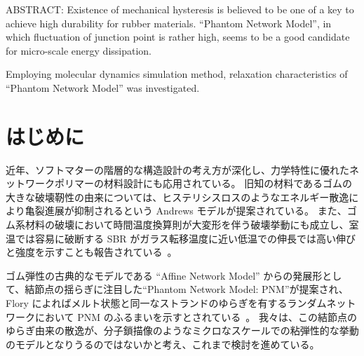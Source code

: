 \documentclass[uplatex,10pt,a4paper,twocolumn]{jsarticle}
\begin{document}


\begin{spacing}{0.95}
ABSTRACT: 
Existence of mechanical hysteresis is believed to be one of a key to achieve high durability for rubber materials.
``Phantom Network Model'', in which fluctuation of junction point is rather high, seems to be a good candidate for micro-scale energy dissipation.

Employing molecular dynamics simulation method, relaxation characteristics of ``Phantom Network Model'' was investigated.
\end{spacing}

\section{はじめに}
近年、ソフトマターの階層的な構造設計の考え方が深化し、力学特性に優れたネットワークポリマーの材料設計にも応用されている。
旧知の材料であるゴムの大きな破壊靭性の由来については、ヒステリシスロスのようなエネルギー散逸により亀裂進展が抑制されるという Andrews モデルが提案されている\cite{andrews}。
また、ゴム系材料の破壊において時間温度換算則が大変形を伴う破壊挙動にも成立し、室温では容易に破断する SBR がガラス転移温度に近い低温での伸長では高い伸びと強度を示すことも報告されている~\cite{smith}。

ゴム弾性の古典的なモデルである ``Affine Network Model'' からの発展形として、結節点の揺らぎに注目した``Phantom Network Model: PNM''が提案され、Flory によればメルト状態と同一なストランドのゆらぎを有するランダムネットワークにおいて PNM のふるまいを示すとされている~\cite{flory}。
我々は、この結節点のゆらぎ由来の散逸が、分子鎖描像のようなミクロなスケールでの粘弾性的な挙動のモデルとなりうるのではないかと考え、これまで検討を進めている。
\end{document}
